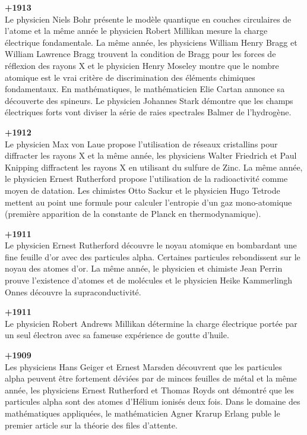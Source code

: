 \textbf{+1913}\\
Le physicien Niels Bohr présente le modèle quantique en couches circulaires de l'atome et la même année le physicien Robert Millikan mesure la charge électrique fondamentale. La même année, les physiciens William Henry Bragg et William Lawrence Bragg trouvent la condition de Bragg pour les forces de réflexion des rayons X et le physicien Henry Moseley montre que le nombre atomique est le vrai critère de discrimination des éléments chimiques fondamentaux. En mathématiques, le mathématicien Elie Cartan annonce sa découverte des spineurs. Le physicien Johannes Stark démontre que les champs électriques forts vont diviser la série de raies spectrales Balmer de l'hydrogène.

\textbf{+1912}\\
Le physicien Max von Laue propose l'utilisation de réseaux cristallins pour diffracter les rayons X et la même année, les physiciens Walter Friedrich et Paul Knipping diffractent les rayons X en utilisant du sulfure de Zinc. La même année, le physicien Ernest Rutherford propose l'utilisation de la radioactivité comme moyen de datation. Les chimistes Otto Sackur et le physicien Hugo Tetrode mettent au point une formule pour calculer l'entropie d'un gaz mono-atomique (première apparition de la constante de Planck en thermodynamique).

\textbf{+1911}\\
Le physicien Ernest Rutherford découvre le noyau atomique en bombardant une fine feuille d'or avec des particules alpha. Certaines particules rebondissent sur le noyau des atomes d'or. La même année, le physicien et chimiste Jean Perrin prouve l'existence d'atomes et de molécules et le physicien Heike Kammerlingh Onnes découvre la supraconductivité.

\textbf{+1911}\\
Le physicien Robert Andrews Millikan détermine la charge électrique portée par un seul électron avec sa fameuse expérience de goutte d'huile.

\textbf{+1909}\\
Les physiciens Hans Geiger et Ernest Marsden découvrent que les particules alpha peuvent être fortement déviées par de minces feuilles de métal et la même année, les physiciens Ernest Rutherford et Thomas Royds ont démontré que les particules alpha sont des atomes d'Hélium ionisés deux fois. Dans le domaine des mathématiques appliquées, le mathématicien Agner Krarup Erlang puble le premier article sur la théorie des files d'attente.

